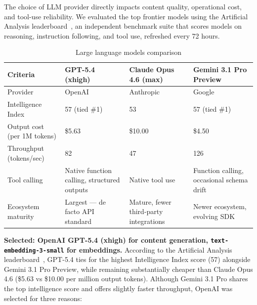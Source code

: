\documentclass[a4paper]{article}
\begin{document}
The choice of LLM provider directly impacts content quality,
operational cost, and tool-use reliability. We evaluated the top
frontier models using the Artificial Analysis
leaderboard~\cite{artificialanalysis2025}, an independent
benchmark suite that scores models on reasoning, instruction
following, and tool use, refreshed every 72 hours.

\begin{table}[H]
\centering
\caption{Large language models comparison}
\label{tab:llm-comparison}
\begin{tabular}{l p{3.5cm} p{3.5cm} p{3.5cm}}
\hline
\textbf{Criteria} & \textbf{GPT-5.4 (xhigh)} & \textbf{Claude Opus 4.6 (max)} & \textbf{Gemini 3.1 Pro Preview} \\
\hline
Provider & OpenAI & Anthropic & Google \\
Intelligence Index & 57 (tied \#1) & 53 & 57 (tied \#1) \\
Output cost (per 1M tokens) & \$5.63 & \$10.00 & \$4.50 \\
Throughput (tokens/sec) & 82 & 47 & 126 \\
Tool calling & Native function calling, structured outputs & Native tool use & Function calling, occasional schema drift \\
Ecosystem maturity & Largest --- de facto API standard & Mature, fewer third-party integrations & Newer ecosystem, evolving SDK \\
\hline
\end{tabular}
\end{table}

\textbf{Selected: OpenAI GPT-5.4 (xhigh) for content generation,
\texttt{text-embedding-3-small} for embeddings.}
According to the Artificial Analysis
leaderboard~\cite{artificialanalysis2025}, GPT-5.4 ties for the
highest Intelligence Index score (57) alongside Gemini 3.1 Pro
Preview, while remaining substantially cheaper than Claude Opus
4.6 (\$5.63 vs \$10.00 per million output tokens). Although
Gemini 3.1 Pro shares the top intelligence score and offers
slightly faster throughput, OpenAI was selected for three
reasons:
\end{document}
